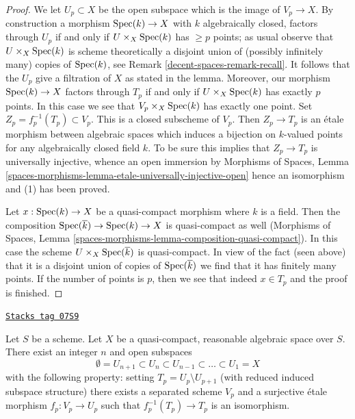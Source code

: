 \begin{proof}
\medskip\noindent
We let $U_p \subset X$ be the open subspace which is the
image of $V_p \to X$. By construction a morphism $\operatorname{Spec}(k) \to X$ with
$k$ algebraically closed, factors through $U_p$ if and only if
$U \times_X \operatorname{Spec}(k)$ has $\geq p$ points; as usual observe that
$U \times_X \operatorname{Spec}(k)$ is scheme theoretically a disjoint union of
(possibly infinitely many) copies of $\operatorname{Spec}(k)$, see
Remark \ref{decent-spaces-remark-recall}. It follows that
the $U_p$ give a filtration of $X$ as stated in the lemma.
Moreover, our morphism $\operatorname{Spec}(k) \to X$ factors through $T_p$
if and only if $U \times_X \operatorname{Spec}(k)$ has exactly $p$ points.
In this case we see that $V_p \times_X \operatorname{Spec}(k)$ has exactly one point.
Set $Z_p = f_p^{-1}(T_p) \subset V_p$. This is a closed subscheme of $V_p$.
Then $Z_p \to T_p$ is an \'etale morphism between
algebraic spaces which induces a bijection on $k$-valued
points for any algebraically closed field $k$. To be sure this
implies that $Z_p \to T_p$ is universally injective, whence an
open immersion by
Morphisms of Spaces, Lemma
\ref{spaces-morphisms-lemma-etale-universally-injective-open}
hence an isomorphism and (1) has been proved.

\medskip\noindent
Let $x : \operatorname{Spec}(k) \to X$ be a quasi-compact morphism where $k$ is a field.
Then the composition $\operatorname{Spec}(\overline{k}) \to \operatorname{Spec}(k) \to X$ is quasi-compact
as well (Morphisms of Spaces, Lemma
\ref{spaces-morphisms-lemma-composition-quasi-compact}).
In this case the scheme $U \times_X \operatorname{Spec}(\overline{k})$ is
quasi-compact. In view of the fact (seen above) that it is a disjoint union
of copies of $\operatorname{Spec}(\overline{k})$ we find that it has finitely many points.
If the number of points is $p$, then we see that indeed $x \in T_p$ and
the proof is finished.
\end{proof}

\begin{lemma}
\label{decent-spaces-lemma-filter-reasonable}
\href{https://stacks.math.columbia.edu/tag/07S9}{\texttt{Stacks tag 07S9}}

Let $S$ be a scheme. Let $X$ be a quasi-compact, reasonable algebraic space
over $S$. There exist an integer $n$ and open subspaces
$$
\emptyset = U_{n + 1} \subset
U_n \subset U_{n - 1} \subset \ldots \subset U_1 = X
$$
with the following property: setting $T_p = U_p \setminus U_{p + 1}$
(with reduced induced subspace structure) there exists a separated scheme
$V_p$ and a surjective \'etale morphism $f_p : V_p \to U_p$ such that
$f_p^{-1}(T_p) \to T_p$ is an isomorphism.
\end{lemma}

